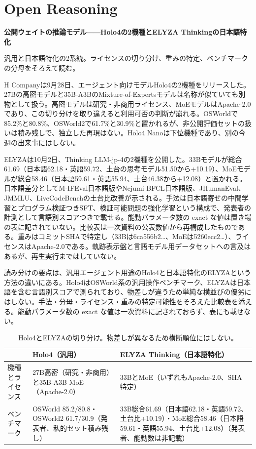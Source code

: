 \section{Open Reasoning}
\begin{wideflow}
{\Large\bfseries 公開ウェイトの推論モデル――Holo4の2機種とELYZA Thinkingの日本語特化}\par
\smallskip
{\color{SurveyMuted}汎用と日本語特化の2系統。ライセンスの切り分け、重みの特定、ベンチマークの分母をそろえて読む。}\par
\end{wideflow}

H Companyは9月28日、エージェント向けモデルHolo4の2機種をリリースした\cite{holo4}。27Bの高密モデルと35B-A3BのMixture-of-Expertsモデルは名称が似ていても別物として扱う。高密モデルは研究・非商用ライセンス、MoEモデルはApache-2.0であり、この切り分けを取り違えると利用可否の判断が崩れる。OSWorldで85.2\%と80.8\%、OSWorld2で61.7\%と30.9\%と置かれるが、非公開評価セットの扱いは積み残しで、独立した再現はない。Holo4 Nanoは下位機種であり、別の今週の出来事にはしない。

ELYZAは10月2日、Thinking LLM-jp-4の2機種を公開した\cite{elyza}。33Bモデルが総合61.69（日本語62.18・英語59.72、土台の思考モデル51.50から+10.19）、MoEモデルが総合58.46（日本語59.61・英語55.94、土台46.38から+12.08）と置かれる。日本語差分としてM-IFEval日本語版やNejumi BFCL日本語版、JHumanEval、JMMLU、LiveCodeBenchの土台比改善が示される。手法は日本語寄せの中間学習とプログラム検証つきSFT、検証可能問題の強化学習という構成で、発表者の計測として言語別スコアつきで載せる。能動パラメータ数の exact な値は置き場の表に記されていない。比較表は一次資料の公表数値から再構成したものである。重みはコミットSHAで特定し（33Bは6ca556b2…、MoEは5260ecc2…）、ライセンスはApache-2.0である。軌跡表示盤と言語モデル用データセットへの言及はあるが、再生実行まではしていない。

読み分けの要点は、汎用エージェント用途のHolo4と日本語特化のELYZAという方法の違いにある。Holo4はOSWorld系の汎用操作ベンチマーク、ELYZAは日本語を含む言語別スコアで測られており、物差しが違うため単純な横並びの優劣にはしない。手法・分母・ライセンス・重みの特定可能性をそろえた比較表を添える。能動パラメータ数の exact な値は一次資料に記されておらず、表にも載せない。

\begin{table}[h]
\centering\footnotesize
\begin{tabularx}{0.98\linewidth}{@{}lXX@{}}
\toprule
 & Holo4（汎用） & ELYZA Thinking（日本語特化） \\
\midrule
機種とライセンス & 27B高密（研究・非商用）と35B-A3B MoE（Apache-2.0） & 33BとMoE（いずれもApache-2.0、SHA特定） \\
ベンチマーク & OSWorld 85.2/80.8・OSWorld2 61.7/30.9（発表者、私的セット積み残し） & 33B総合61.69（日本語62.18・英語59.72、土台比+10.19）・MoE総合58.46（日本語59.61・英語55.94、土台比+12.08）（発表者、能動数は非記載） \\
\bottomrule
\end{tabularx}
\caption{Holo4とELYZAの切り分け。物差しが異なるため横断順位にはしない。}
\end{table}

